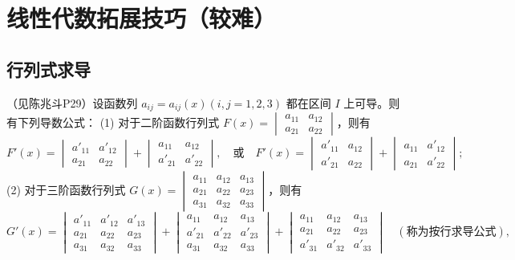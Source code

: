 \chapter{线性代数拓展技巧（较难）}

\section{行列式求导}
（见陈兆斗P29）设函数列 \(a_{ij}=a_{ij}(x)(i,j=1,2,3)\) 都在区间 \(I\) 上可导。则有下列导数公式：
(1) 对于二阶函数行列式 \(F(x)=\begin{vmatrix}a_{11}&a_{12}\\a_{21}&a_{22}\end{vmatrix}\)，则有
\[
F'(x)=\begin{vmatrix}a'_{11}&a'_{12}\\a_{21}&a_{22}\end{vmatrix}+\begin{vmatrix}a_{11}&a_{12}\\a'_{21}&a'_{22}\end{vmatrix}, \quad \text{或} \quad F'(x)=\begin{vmatrix}a'_{11}&a_{12}\\a'_{21}&a_{22}\end{vmatrix}+\begin{vmatrix}a_{11}&a'_{12}\\a_{21}&a'_{22}\end{vmatrix};
\]
(2) 对于三阶函数行列式 \(G(x)=\begin{vmatrix}a_{11}&a_{12}&a_{13}\\a_{21}&a_{22}&a_{23}\\a_{31}&a_{32}&a_{33}\end{vmatrix}\)，则有
\[
G'(x)=\begin{vmatrix}a'_{11}&a'_{12}&a'_{13}\\a_{21}&a_{22}&a_{23}\\a_{31}&a_{32}&a_{33}\end{vmatrix}+\begin{vmatrix}a_{11}&a_{12}&a_{13}\\a'_{21}&a'_{22}&a'_{23}\\a_{31}&a_{32}&a_{33}\end{vmatrix}+\begin{vmatrix}a_{11}&a_{12}&a_{13}\\a_{21}&a_{22}&a_{23}\\a'_{31}&a'_{32}&a'_{33}\end{vmatrix} \quad (\text{称为按行求导公式}),
\]
